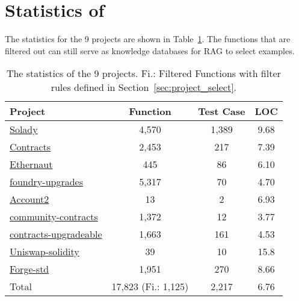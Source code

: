 \newpage


\appendix


\section{Statistics of \datasetname}
\label{sec:stats}


The statistics for the 9 projects are shown in Table~\ref{tab:dataset-statistics}. 
The functions that are filtered out can still serve as knowledge databases for RAG to select examples.

\begin{table}[htbp!]
\centering
\caption{The statistics of the 9 projects. 
Fi.: Filtered Functions with filter rules defined in Section~\ref{sec:project_select}.
}
\label{tab:dataset-statistics}
\resizebox{\linewidth}{!}
{
\begin{tabular}{lccc}
\toprule
\textbf{Project} & \textbf{Function} & \textbf{Test Case} & \textbf{LOC} \\
\midrule
\href{https://github.com/Vectorized/solady}{Solady} & 4,570 &  1,389 & 9.68 \\
\href{https://github.com/OpenZeppelin/openzeppelin-contracts}{Contracts}
& 2,453  & 217 & 7.39 \\
\href{https://github.com/OpenZeppelin/ethernaut}{Ethernaut} & 445 & 86 & 6.10 \\
\href{https://github.com/OpenZeppelin/openzeppelin-foundry-upgrades}{foundry-upgrades} & 5,317 & 70 & 4.70 \\
\href{https://github.com/0xethsign/Account2}{Account2} & 13 & 2 & 6.93 \\
\href{https://github.com/OpenZeppelin/openzeppelin-community-contracts}{community-contracts} & 1,372 & 12 & 3.77 \\
\href{https://github.com/OpenZeppelin/openzeppelin-contracts-upgradeable}{contracts-upgradeable}& 1,663 & 161 & 4.53 \\
\href{https://github.com/OpenZeppelin/uniswap-solidity-hooks-template}{Uniswap-solidity} & 39 & 10 & 15.8 \\
\href{https://github.com/foundry-rs/forge-std}{Forge-std} & 1,951 & 270 & 8.66 \\
\midrule
Total & 17,823 (Fi.: 1,125) & 2,217 & 6.76 \\
\bottomrule
\end{tabular}
}
\end{table}


